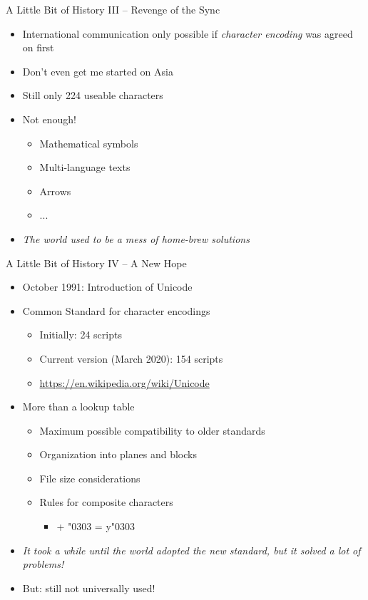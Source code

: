 
\begin{frame}{A Little Bit of History III -- Revenge of the Sync}
%
\begin{itemize}
\item International communication only possible if \emph{character encoding} was agreed on first
\item Don't even get me started on Asia
\item Still only 224 useable characters
\item Not enough!
	\begin{itemize}
	\item Mathematical symbols
	\item Multi-language texts
	\item Arrows
	\item ...
	\end{itemize}
\item[\Thus] \emph{The world used to be a mess of home-brew solutions}
\end{itemize}
%
\end{frame}


\begin{frame}{A Little Bit of History IV -- A New Hope}
%
\begin{itemize}
\item October 1991: Introduction of Unicode
\item Common Standard for character encodings
	\begin{itemize}
	\item Initially: 24 scripts
	\item Current version (March 2020): 154 scripts
	\item \url{https://en.wikipedia.org/wiki/Unicode}
	\end{itemize}
\item More than a lookup table
	\begin{itemize}
	\item Maximum possible compatibility to older standards
	\item Organization into planes and blocks
	\item File size considerations
	\item Rules for composite characters
		\begin{itemize}
		\item {} + {\DejaSans \char"0303}  = {\DejaSans y\char"0303}
		\end{itemize}
	\end{itemize}
\item[\Thus] \emph{It took a while until the world adopted the new standard, but it solved a lot of problems!}
\item[\Thus] But: still not universally used!
\end{itemize}
%
\end{frame}

